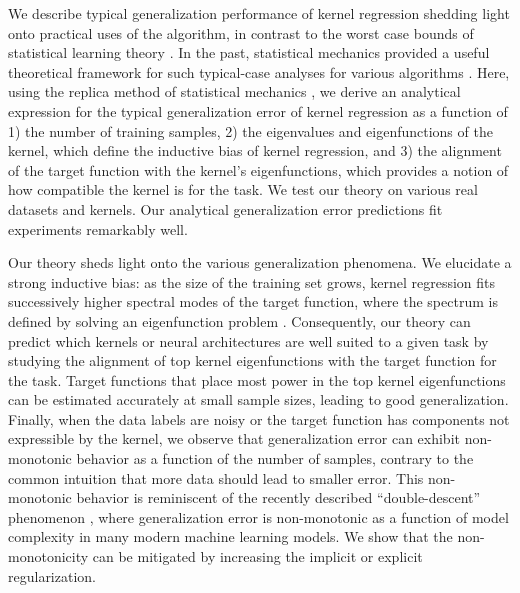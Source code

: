 \documentclass[11pt]{article}
\begin{document}
We describe typical generalization performance of kernel regression shedding light onto practical uses of the algorithm, in contrast to the worst case bounds of statistical learning theory \cite{Vapnik1998,mohri2018foundations,cucker2002best,caponnetto2007optimal,liang2018just}. In the past, statistical mechanics provided a useful theoretical framework for such typical-case analyses for various algorithms \cite{gardner1988space,Hertz_1989, krogh, sompolinsky1992examples,optimalperceptron,statmechofrule,sollich1999learning,Malzahn_Opper,engel2001statistical,bahri2019statistical}. Here, using the replica method of statistical mechanics \cite{mezard1987spin}, we derive an analytical expression for the typical generalization error of kernel regression as a function of 1) the number of training samples, 2) the eigenvalues and eigenfunctions of the kernel, which define the inductive bias of kernel regression, and 3) the alignment of the target function with the kernel's eigenfunctions, which provides a notion of how compatible the kernel is for the task. We test our theory on various real datasets and kernels. Our analytical generalization error predictions fit experiments remarkably well.


Our theory sheds light onto the various generalization phenomena. We elucidate a strong inductive bias: as the size of the training set grows, kernel regression fits successively higher spectral modes of the target function, where the spectrum is defined by solving an eigenfunction problem \cite{bordelon2020spectrum, jacot2020implicit,jacot2020kernel, liang_isometry}. Consequently, our theory can predict which kernels or neural architectures are well suited to a given task by studying the alignment of top kernel eigenfunctions with the target function for the task. Target functions that place most power in the top kernel eigenfunctions can be estimated accurately at small sample sizes, leading to good generalization. Finally, when the data labels are noisy or the target function has components not expressible by the kernel, we observe that generalization error can exhibit non-monotonic behavior as a function of the number of samples, contrary to the common intuition that more data should lead to smaller error. This non-monotonic behavior is reminiscent of the recently described ``double-descent'' phenomenon \cite{belkin2019reconciling,nakkiran2019deep,loog2020brief,montanari2019generalization}, where generalization error is non-monotonic as a function of model complexity in many modern machine learning models.  We show that the non-monotonicity can be mitigated by increasing the implicit or explicit regularization.
\end{document}
